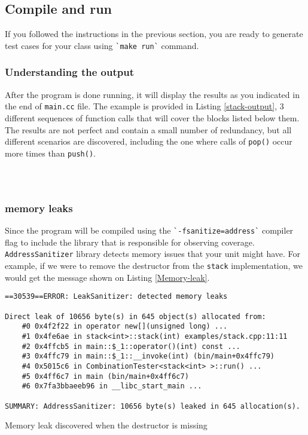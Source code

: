 \documentclass{elteikthesis}[2018/06/06]
\newcommand*{\code}{\lstinline[keywordstyle=\color{violet}, basicstyle=\color{violet}]}
\begin{document}
\subsection{Compile and run}
\label{sec-2-4-3}
If you followed the instructions in the previous section, you are ready to generate test cases for your class using \code{`make run`} command. \\
\subsubsection{Understanding the output}
\label{sec-2-4-3-1}
After the program is done running, it will display the results as you indicated in the end of \code{main.cc} file. The example is provided in Listing \ref{stack-output}, 3 different sequences of function calls that will cover the blocks listed below them. The results are not perfect and contain a small number of redundancy, but all different scenarios are discovered, including the one where calls of \code{pop()} occur more times than \code{push()}. \\

\begin{listing}
\caption{\label{stack-output}Output of program for the \code{stack} class}
\inputminted{text}{results.txt} \\
\end{listing}
\subsubsection{memory leaks}
\label{sec-2-4-3-2}
Since the program will be compiled using the \code{`-fsanitize=address`} compiler flag to include the library that is responsible for observing coverage. \code{AddressSanitizer} library detects memory issues that your unit might have. For example, if we were to remove the destructor from the \code{stack} implementation, we would get the message shown on Listing \ref{Memory-leak}. \\
\begin{listing}[H]
\begin{verbatim}
==30539==ERROR: LeakSanitizer: detected memory leaks

Direct leak of 10656 byte(s) in 645 object(s) allocated from:
    #0 0x4f2f22 in operator new[](unsigned long) ...
    #1 0x4fe6ae in stack<int>::stack(int) examples/stack.cpp:11:11
    #2 0x4ffcb5 in main::$_1::operator()(int) const ...
    #3 0x4ffc79 in main::$_1::__invoke(int) (bin/main+0x4ffc79)
    #4 0x5015c6 in CombinationTester<stack<int> >::run() ...
    #5 0x4ff6c7 in main (bin/main+0x4ff6c7)
    #6 0x7fa3bbaeeb96 in __libc_start_main ...

SUMMARY: AddressSanitizer: 10656 byte(s) leaked in 645 allocation(s).
\end{verbatim}
\caption{\label{Memory-leak}Memory leak discovered when the destructor is missing}
\end{listing}
\end{document}
